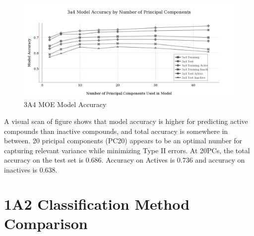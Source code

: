 \begin{figure}[H]
\includegraphics[width=1\textwidth]{../img/3a4_moe_model_accuracy.png}
\caption{3A4 MOE Model Accuracy}
\end{figure}

A visual scan of figure shows that model accuracy is higher for predicting active compounds than inactive compounds, and total accuracy is somewhere in between. 20 pricipal components (PC20) appears to be an optimal number for capturing relevant variance while minimizing Type II errors. At 20PCs, the total accuracy on the test set is 0.686. Accuracy on Actives is 0.736 and accuracy on inactives is 0.638.



\section{1A2 Classification Method Comparison}

